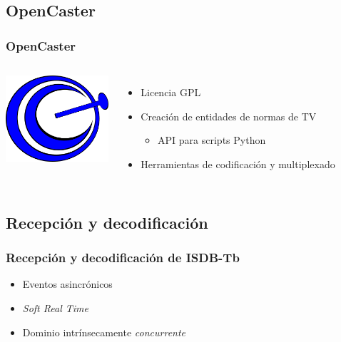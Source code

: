 \documentclass[a4paper,11pt]{beamer}
\begin{document}
	\subsection{OpenCaster}
		\begin{frame}
			\frametitle{OpenCaster}
			\begin{columns}
				\begin{center}
					\includegraphics[height=3.2cm]{opencaster_logo.png}
				\end{center}
				
					\begin{itemize}
						\item Licencia GPL
						\item Creación de entidades de normas de TV
							\begin{itemize}
								\item API para scripts Python 
							\end{itemize}
						\item Herramientas de codificación y multiplexado
					\end{itemize}
			\end{columns}
		\end{frame}


	\subsection{Recepción y decodificación}
		\begin{frame}
			\frametitle{Recepción y decodificación de ISDB-Tb}
			\begin{itemize}
				\item Eventos asincrónicos
				\item \emph{Soft Real Time}
				\item Dominio intrínsecamente \emph{concurrente}
			\end{itemize}
		\end{frame}
\end{document}
